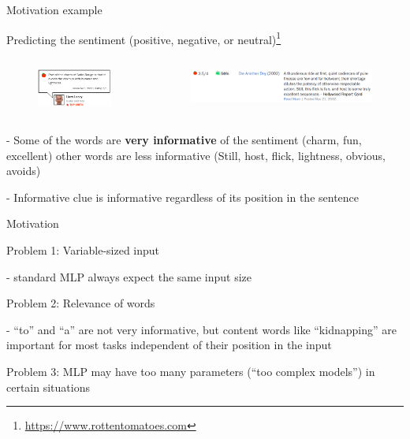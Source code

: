 \documentclass[12pt]{beamer}
\begin{document}
\begin{frame}{Motivation example}
	


Predicting the sentiment (positive, negative, or neutral)\footnote{\url{https://www.rottentomatoes.com}}

\begin{columns}
	\begin{column}{4cm}
\begin{figure}
	\includegraphics[width=\linewidth]{img/review1.png}
\end{figure}
	\end{column}
\begin{column}{7cm}
\begin{figure}
	\includegraphics[trim={6cm 0 0 0},clip,width=\linewidth]{img/review2.png}
\end{figure}

\end{column}
\end{columns}
	


- Some of the words are \textbf{very informative} of the sentiment (charm, fun, excellent) other
words are less informative (Still, host, flick, lightness, obvious, avoids)


- Informative clue is informative regardless of its position in the sentence

	
\end{frame}


\begin{frame}{Motivation}

Problem 1: Variable-sized input

- standard MLP always expect the same input size



Problem 2: Relevance of words

- “to” and “a” are not very informative, but content words like “kidnapping” are important for most tasks independent of their position in the input


Problem 3: MLP may have too many parameters (“too complex models”) in certain situations 

\end{frame}
\end{document}
